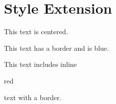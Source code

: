 
\chapter{\label{style-extension}Style Extension}
\begin{center}

\par This text is centered.
\end{center}

\begin{fbox}
{\color{blue}
\par This text has a border and is blue.}
\end{fbox}

\par This text includes inline 
\begin{fbox}
{\color{red}red}
\end{fbox}
 text with a border. 